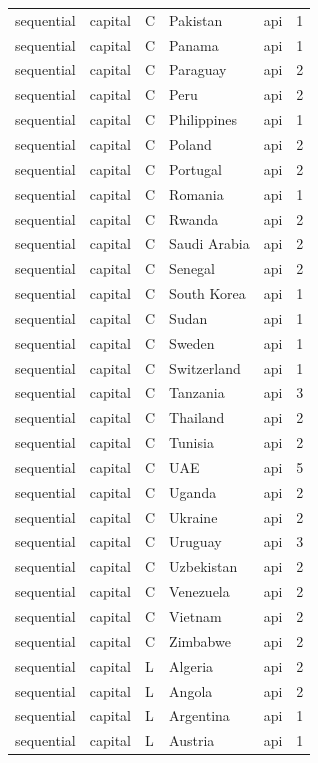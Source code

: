 \begin{tabular}{lllllr}
sequential & capital & C & Pakistan & api & 1 \\
sequential & capital & C & Panama & api & 1 \\
sequential & capital & C & Paraguay & api & 2 \\
sequential & capital & C & Peru & api & 2 \\
sequential & capital & C & Philippines & api & 1 \\
sequential & capital & C & Poland & api & 2 \\
sequential & capital & C & Portugal & api & 2 \\
sequential & capital & C & Romania & api & 1 \\
sequential & capital & C & Rwanda & api & 2 \\
sequential & capital & C & Saudi Arabia & api & 2 \\
sequential & capital & C & Senegal & api & 2 \\
sequential & capital & C & South Korea & api & 1 \\
sequential & capital & C & Sudan & api & 1 \\
sequential & capital & C & Sweden & api & 1 \\
sequential & capital & C & Switzerland & api & 1 \\
sequential & capital & C & Tanzania & api & 3 \\
sequential & capital & C & Thailand & api & 2 \\
sequential & capital & C & Tunisia & api & 2 \\
sequential & capital & C & UAE & api & 5 \\
sequential & capital & C & Uganda & api & 2 \\
sequential & capital & C & Ukraine & api & 2 \\
sequential & capital & C & Uruguay & api & 3 \\
sequential & capital & C & Uzbekistan & api & 2 \\
sequential & capital & C & Venezuela & api & 2 \\
sequential & capital & C & Vietnam & api & 2 \\
sequential & capital & C & Zimbabwe & api & 2 \\
sequential & capital & L & Algeria & api & 2 \\
sequential & capital & L & Angola & api & 2 \\
sequential & capital & L & Argentina & api & 1 \\
sequential & capital & L & Austria & api & 1 \\

\end{tabular}
